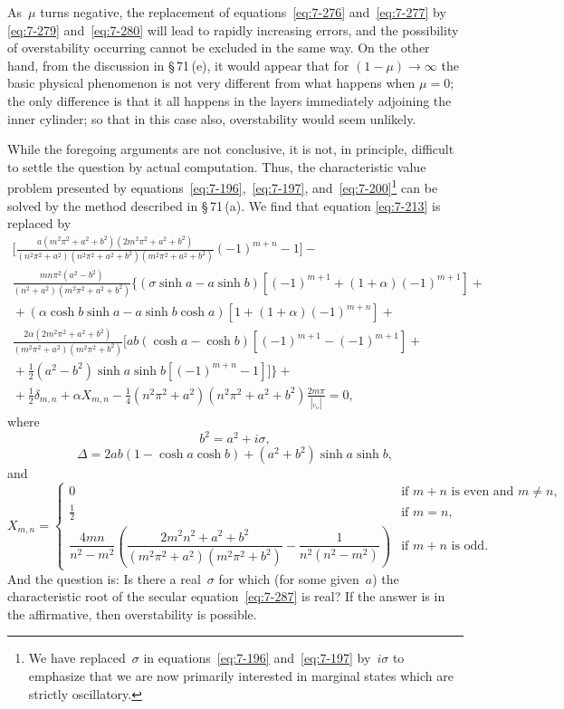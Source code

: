 As~$\mu$ turns negative, the replacement of equations~\eqref{eq:7-276} and~\eqref{eq:7-277} by
\eqref{eq:7-279} and~\eqref{eq:7-280} will lead to rapidly increasing errors, and the possibility
of overstability occurring cannot be excluded in the same way.  On the
other hand, from the discussion in \S\,71\,(e), it would appear that for
$(1-\mu) \to \infty$ the basic physical phenomenon is not very different from
what happens when $\mu = 0$; the only difference is that it all happens in
the layers immediately adjoining the inner cylinder; so that in this case
also, overstability would seem unlikely.

While the foregoing arguments are not conclusive, it is not, in principle,
difficult to settle the question by actual computation.  Thus, the characteristic value problem presented by equations~\eqref{eq:7-196},~\eqref{eq:7-197}, and~\eqref{eq:7-200}\footnote{We have replaced~$\sigma$ in equations~\eqref{eq:7-196} and~\eqref{eq:7-197} by~$i\sigma$ to emphasize that we are now primarily interested in marginal states which are strictly oscillatory.}
can be solved by the method described in \S\,71\,(a).  We find that equation
\eqref{eq:7-213} is replaced by
\begin{multline}
\label{eq:7-287}
\Biggl[\frac{a(m^2\pi^2+a^2+b^2)(2m^2\pi^2+a^2+b^2)}{(n^2\pi^2+a^2)(n^2\pi^2+a^2+b^2)(m^2\pi^2+a^2+b^2)}(-1)^{m+n}-1\Biggr] - {} \\
\frac{mn\pi^2(a^2-b^2)}{(n^2+a^2)(m^2\pi^2+a^2+b^2)}\bigl\{(\sigma\sinh a - a\sinh b)[(-1)^{m+1}+(1+\alpha)(-1)^{m+1}] + {} \\
{}+(\alpha\cosh b\sinh a - a\sinh b\cosh a)[1+(1+\alpha)(-1)^{m+n}] + {} \\
\frac{2\alpha(2m^2\pi^2+a^2+b^2)}{(m^2\pi^2+a^2)(m^2\pi^2+b^2)}
  \bigl[ab(\cosh a - \cosh b)[(-1)^{m+1}-(-1)^{m+1}] + {} \\
{}+\tfrac{1}{2}(a^2-b^2)\sinh a\sinh b[(-1)^{m+n}-1]\bigr]\Biggr\} + {} \\
{}+\tfrac{1}{2}\delta_{m,n} + \alpha X_{m,n}
  - \tfrac{1}{4}(n^2\pi^2+a^2)(n^2\pi^2+a^2+b^2)\frac{2m\pi}{|_{v_n}|}
= 0,
\end{multline}
where
\begin{equation}
\label{eq:7-288}
b^2 = a^2 + i\sigma,
\end{equation}
\begin{equation}
\label{eq:7-289}
\Delta = 2ab(1-\cosh a\cosh b) + (a^2+b^2)\sinh a\sinh b,
\end{equation}
and
\begin{equation}
\label{eq:7-290}
X_{m,n} = \begin{cases}
0 & \text{if } m+n \text{ is even and } m \ne n, \\
\frac{1}{2} & \text{if } m = n, \\
\dfrac{4mn}{n^2-m^2}\!\left(
  \dfrac{2m^2n^2+a^2+b^2}{(m^2\pi^2+a^2)(m^2\pi^2+b^2)}
  - \dfrac{1}{n^2(n^2-m^2)}\right)
& \text{if } m+n \text{ is odd.}
\end{cases}
\end{equation}
And the question is: Is there a real~$\sigma$ for which (for some given~$a$) the
characteristic root of the secular equation~\eqref{eq:7-287} is real?  If the answer is
in the affirmative, then overstability is possible.

